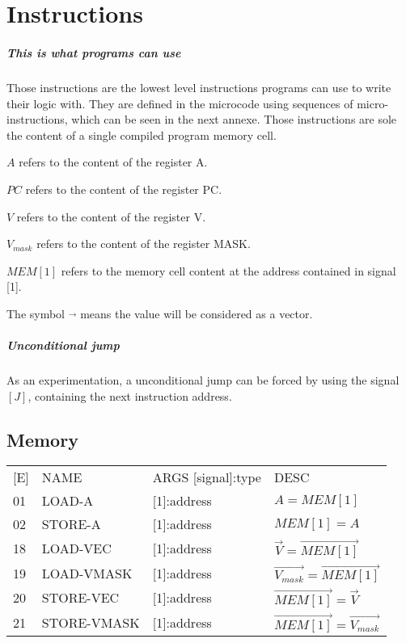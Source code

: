 \chapter{Instructions}
\paragraph{This is what programs can use}
Those instructions are the lowest level instructions programs can use to write their logic with. 
They are defined in the microcode using sequences of micro- instructions, which can be seen in the next annexe.
Those instructions are sole the content of a single compiled program memory cell.

\textbf{$A$} refers to the content of the register A.

\textbf{$PC$} refers to the content of the register PC.

\textbf{$V$} refers to the content of the register V.

\textbf{$V_{mask}$} refers to the content of the register MASK.

\textbf{$MEM[1]$} refers to the memory cell content at the address contained in signal [1].

The symbol $\vec{ }$ means the value will be considered as a vector.

\paragraph{Unconditional jump}
As an experimentation, a unconditional jump can be forced by using the signal $[J]$, containing the next instruction address. 

\section{Memory}
\begin{tabular}{l | l | l  l}
[E] & NAME & ARGS [signal]:type & DESC \\
01 & LOAD-A & [1]:address & $A = MEM[1]$\\
02 & STORE-A & [1]:address & $MEM[1] = A$\\
18 & LOAD-VEC & [1]:address & $\vec{V} = \vec{MEM[1]}$\\
19 & LOAD-VMASK & [1]:address & $\vec{V_{mask}} = \vec{MEM[1]}$\\
20 & STORE-VEC & [1]:address & $\vec{MEM[1]} = \vec{V}$\\
21 & STORE-VMASK & [1]:address & $\vec{MEM[1]} = \vec{V_{mask}}$\\
\end{tabular}

